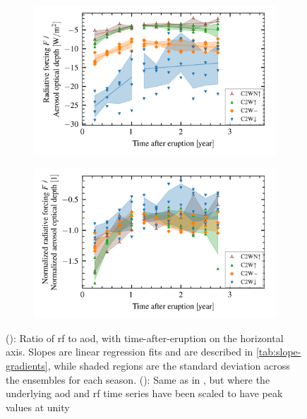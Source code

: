 \documentclass{ametsocV5}
\begin{document}
\begin{figure}
  \begin{subfigure}{\linewidth}
    \centering
    \includegraphics[width=0.95\linewidth]{figures/aod_vs_toa_avg_loop_ratio}
    \caption{}%
    \label{fig:aod_vs_toa_avg_loop_ratio}
  \end{subfigure}
  \begin{subfigure}{\linewidth}
    \centering
    \includegraphics[width=0.95\linewidth]{figures/aod_vs_toa_avg_loop_ratio_scaled}
    \caption{}%
    \label{fig:aod_vs_toa_avg_loop_ratio_scaled}
  \end{subfigure}

  \caption{(): Ratio of \ac{rf} to \ac{aod}, with
    time-after-eruption on the horizontal axis. Slopes are linear regression fits and are
    described in \cref{tab:slope-gradients}, while shaded regions are the standard deviation
    across the ensembles for each season. ():
    Same as in , but where the underlying \ac{aod} and
    \ac{rf} time series have been scaled to have peak values at
    unity}\label{fig:aod_vs_toa_avg_loop_ratios}%
\end{figure}
\end{document}
